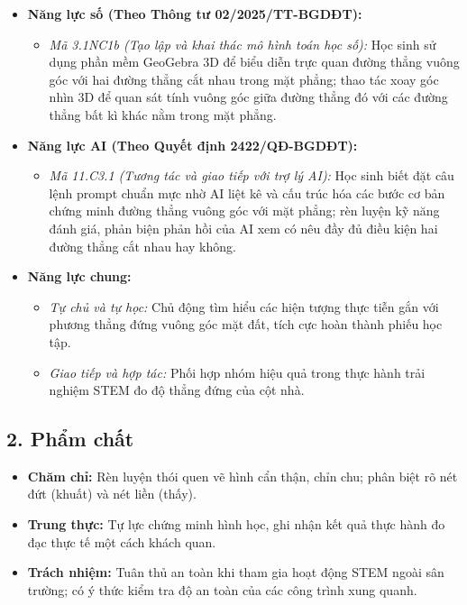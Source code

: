 \documentclass[12pt, a4paper]{article}
\begin{document}
\begin{itemize}[leftmargin=1.2cm]
    \item \textbf{Năng lực số (Theo Thông tư 02/2025/TT-BGDĐT):}
    \begin{itemize}[leftmargin=0.6cm]
        \item \textit{Mã 3.1NC1b (Tạo lập và khai thác mô hình toán học số):} Học sinh sử dụng phần mềm GeoGebra 3D để biểu diễn trực quan đường thẳng vuông góc với hai đường thẳng cắt nhau trong mặt phẳng; thao tác xoay góc nhìn 3D để quan sát tính vuông góc giữa đường thẳng đó với các đường thẳng bất kì khác nằm trong mặt phẳng.
    \end{itemize}

    \item \textbf{Năng lực AI (Theo Quyết định 2422/QĐ-BGDĐT):}
    \begin{itemize}[leftmargin=0.6cm]
        \item \textit{Mã 11.C3.1 (Tương tác và giao tiếp với trợ lý AI):} Học sinh biết đặt câu lệnh prompt chuẩn mực nhờ AI liệt kê và cấu trúc hóa các bước cơ bản chứng minh đường thẳng vuông góc với mặt phẳng; rèn luyện kỹ năng đánh giá, phản biện phản hồi của AI xem có nêu đầy đủ điều kiện hai đường thẳng cắt nhau hay không.
    \end{itemize}

    \item \textbf{Năng lực chung:}
    \begin{itemize}[leftmargin=0.6cm]
        \item \textit{Tự chủ và tự học:} Chủ động tìm hiểu các hiện tượng thực tiễn gắn với phương thẳng đứng vuông góc mặt đất, tích cực hoàn thành phiếu học tập.
        \item \textit{Giao tiếp và hợp tác:} Phối hợp nhóm hiệu quả trong thực hành trải nghiệm STEM đo độ thẳng đứng của cột nhà.
    \end{itemize}
\end{itemize}

\subsection*{2. Phẩm chất}

\begin{itemize}[leftmargin=1.2cm]
    \item \textbf{Chăm chỉ:} Rèn luyện thói quen vẽ hình cẩn thận, chỉn chu; phân biệt rõ nét đứt (khuất) và nét liền (thấy).
    \item \textbf{Trung thực:} Tự lực chứng minh hình học, ghi nhận kết quả thực hành đo đạc thực tế một cách khách quan.
    \item \textbf{Trách nhiệm:} Tuân thủ an toàn khi tham gia hoạt động STEM ngoài sân trường; có ý thức kiểm tra độ an toàn của các công trình xung quanh.
\end{itemize}
\end{document}
